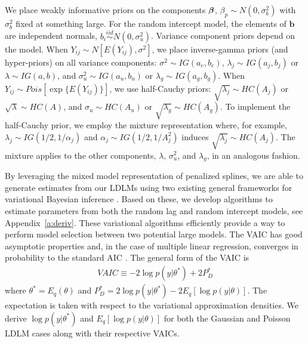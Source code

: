 \documentclass[10pt]{article}
\newcommand{\bbeta}{{\mbox{\boldmath$\beta$}}}
\newcommand{\bb}{\textbf{b}}
\begin{document}
We place weakly informative priors on the components $\bbeta$, $\beta_p \sim N(0, \sigma_b^2)$ with $\sigma_b^2$ fixed at something large. For the random intercept model, the elements of $\bb$ are independent normals, $b_i \stackrel{iid}{\sim} N(0, \sigma_u^2)$. Variance component priors depend on the model. When $Y_{ij} \sim N[E(Y_{ij}), \sigma^2]$, we place inverse-gamma priors (and hyper-priors) on all variance components: $\sigma^2 \sim IG(a_e, b_e)$,  $\lambda_{j} \sim IG(a_{j}, b_{j})$ or $\lambda \sim IG(a, b)$, and $\sigma_u^2 \sim IG(a_u, b_u)$ or $\lambda_{g} \sim IG(a_{g}, b_{g})$.
When $Y_{ij} \sim Pois[\exp\{E(Y_{ij})\}]$, we use half-Cauchy priors: $\sqrt{\lambda_{j}} \sim HC(A_j)$ or $\sqrt{\lambda} \sim HC(A)$, and $\sigma_u \sim HC(A_u)$ or $\sqrt{\lambda_{g}} \sim HC(A_g)$.
To implement the half-Cauchy prior, we employ the mixture representation where, for example, $\lambda_j \sim IG(1/2, 1/\alpha_j)$ and $\alpha_j \sim IG(1/2, 1/A_j^2)$ induces $\sqrt{\lambda_{j}} \sim HC(A_j)$. The mixture applies to the other components, $\lambda$, $\sigma_u^2$, and $\lambda_g$, in an analogous fashion.


By leveraging the mixed model representation of penalized splines, we are able to generate estimates from our LDLMs using two existing general frameworks for variational Bayesian inference \cite{OrmerodWand2010,LutsWand2015}. Based on these, we develop algorithms to estimate parameters from both the random lag and random intercept models, see Appendix~\ref{a:deriv}. These variational algorithms efficiently provide a way to perform model selection between two potential large models. The VAIC has good asymptotic properties and, in the case of multiple linear regression, converges in probability to the standard AIC \cite{You2014}. The general form of the VAIC is
	\begin{align*}
		VAIC \equiv - 2\log{p(y | \theta^*)} + 2P^*_D
	\end{align*}
where $\theta^* = E_q(\theta)$ and $P^*_D = 2\log{p(y | \theta^*)} - 2 E_q[\log{p(y|\theta)}]$. The expectation is taken with respect to the variational approximation densities. We derive $\log{p(y | \theta^*)}$ and $E_q[\log{p(y|\theta)}]$ for both the Gaussian and Poisson LDLM cases along with their respective VAICs.
\end{document}
